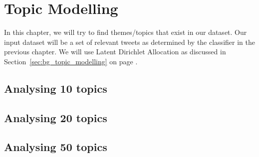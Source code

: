 \chapter{Topic Modelling}
\label{cha:topic_modelling}
In this chapter, we will try to find themes/topics that exist in our dataset. Our input dataset will
be a set of relevant tweets as determined by the classifier in the previous chapter. We will use
Latent Dirichlet Allocation as discussed in Section~\ref{sec:bg_topic_modelling} on page
\pageref{sec:bg_topic_modelling}.

\section{Analysing 10 topics} %
\label{sec:analysing_10_topics}


\section{Analysing 20 topics} %
\label{sec:analysing_20_topics}


\section{Analysing 50 topics} %
\label{sec:analysing_50_topics}
